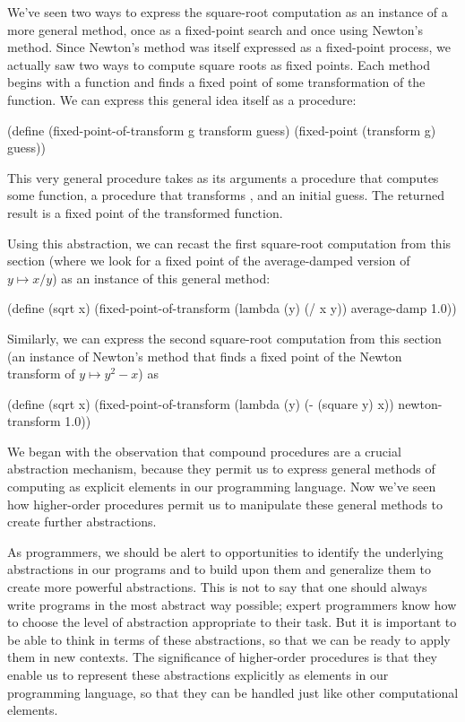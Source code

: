 We've seen two ways to express the square-root computation as an instance of a
more general method, once as a fixed-point search and once using Newton's
method.  Since Newton's method was itself expressed as a fixed-point process,
we actually saw two ways to compute square roots as fixed points.  Each method
begins with a function and finds a fixed point of some transformation of the
function.  We can express this general idea itself as a procedure:

\begin{codeBlock}
(define (fixed-point-of-transform g transform guess)
  (fixed-point (transform g) guess))
\end{codeBlock}

\noindent
This very general procedure takes as its arguments a procedure  that
computes some function, a procedure that transforms , and an initial
guess.  The returned result is a fixed point of the transformed function.

Using this abstraction, we can recast the first square-root computation from
this section (where we look for a fixed point of the average-damped version of
\( y \mapsto x / y \)) as an instance of this general method:

\begin{codeBlock}
(define (sqrt x)
  (fixed-point-of-transform
   (lambda (y) (/ x y)) average-damp 1.0))
\end{codeBlock}

\noindent
Similarly, we can express the second square-root computation from this section
(an instance of Newton's method that finds a fixed point of the Newton
transform of \( y \mapsto y^2 - x \)) as

\begin{codeBlock}
(define (sqrt x)
  (fixed-point-of-transform
   (lambda (y) (- (square y) x)) newton-transform 1.0))
\end{codeBlock}

\noindent
We began  with the observation that compound procedures are a
crucial abstraction mechanism, because they permit us to express general
methods of computing as explicit elements in our programming language.  Now
we've seen how higher-order procedures permit us to manipulate these general
methods to create further abstractions.

As programmers, we should be alert to opportunities to identify the underlying
abstractions in our programs and to build upon them and generalize them to
create more powerful abstractions.  This is not to say that one should always
write programs in the most abstract way possible; expert programmers know how
to choose the level of abstraction appropriate to their task.  But it is
important to be able to think in terms of these abstractions, so that we can be
ready to apply them in new contexts.  The significance of higher-order
procedures is that they enable us to represent these abstractions explicitly as
elements in our programming language, so that they can be handled just like
other computational elements.

